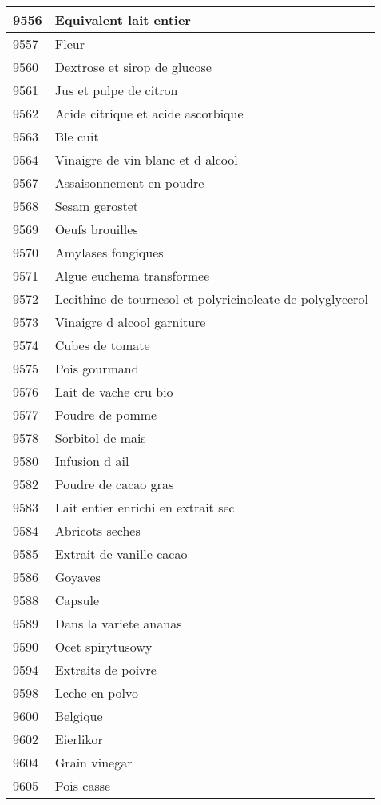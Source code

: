 \begin{longtable}{|l|l|}
9556 & Equivalent lait entier \\ \hline 
9557 & Fleur \\ \hline 
9560 & Dextrose et sirop de glucose \\ \hline 
9561 & Jus et pulpe de citron \\ \hline 
9562 & Acide citrique et acide ascorbique \\ \hline 
9563 & Ble cuit \\ \hline 
9564 & Vinaigre de vin blanc et d alcool \\ \hline 
9567 & Assaisonnement en poudre \\ \hline 
9568 & Sesam gerostet \\ \hline 
9569 & Oeufs brouilles \\ \hline 
9570 & Amylases fongiques \\ \hline 
9571 & Algue euchema transformee \\ \hline 
9572 & Lecithine de tournesol et polyricinoleate de polyglycerol \\ \hline 
9573 & Vinaigre d alcool garniture \\ \hline 
9574 & Cubes de tomate \\ \hline 
9575 & Pois gourmand \\ \hline 
9576 & Lait de vache cru bio \\ \hline 
9577 & Poudre de pomme \\ \hline 
9578 & Sorbitol de mais \\ \hline 
9580 & Infusion d ail \\ \hline 
9582 & Poudre de cacao gras \\ \hline 
9583 & Lait entier enrichi en extrait sec \\ \hline 
9584 & Abricots seches \\ \hline 
9585 & Extrait de vanille cacao \\ \hline 
9586 & Goyaves \\ \hline 
9588 & Capsule \\ \hline 
9589 & Dans la variete ananas \\ \hline 
9590 & Ocet spirytusowy \\ \hline 
9594 & Extraits de poivre \\ \hline 
9598 & Leche en polvo \\ \hline 
9600 & Belgique \\ \hline 
9602 & Eierlikor \\ \hline 
9604 & Grain vinegar \\ \hline 
9605 & Pois casse \\ \hline 

\end{longtable}
